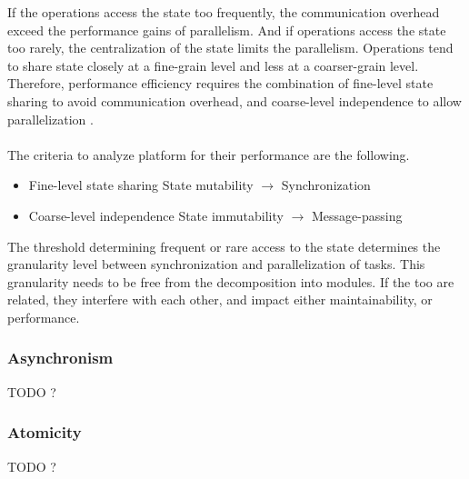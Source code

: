 If the operations access the state too frequently, the communication overhead exceed the performance gains of parallelism.
And if operations access the state too rarely, the centralization of the state limits the parallelism.
Operations tend to share state closely at a fine-grain level and less at a coarser-grain level.
Therefore, performance efficiency requires the combination of fine-level state sharing to avoid communication overhead, and coarse-level independence to allow parallelization \cite{Gustafson1988,Gunther1996,Nelson1996,Gunther2002}.

\paragraph{}

The criteria to analyze platform for their performance are the following.

\begin{itemize}
\item Fine-level state sharing
  \subitem State mutability $\to$ Synchronization
\item Coarse-level independence
  \subitem State immutability $\to$ Message-passing
\end{itemize}

The threshold determining frequent or rare access to the state determines the granularity level between synchronization and parallelization of tasks.
This granularity needs to be free from the decomposition into modules.
If the too are related, they interfere with each other, and impact either maintainability, or performance.


\subsubsection{Asynchronism}
TODO ?


\subsubsection{Atomicity}
TODO ?




